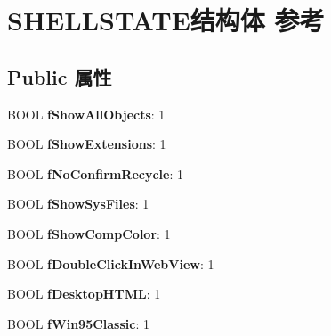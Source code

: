 \hypertarget{struct_s_h_e_l_l_s_t_a_t_e}{}\section{S\+H\+E\+L\+L\+S\+T\+A\+T\+E结构体 参考}
\label{struct_s_h_e_l_l_s_t_a_t_e}
\subsection*{Public 属性}
\begin{DoxyCompactItemize}
\item 
\mbox{\label{struct_s_h_e_l_l_s_t_a_t_e_accc3ecbc80362e9bc1f5f5df528abcb3}} 
B\+O\+OL {\bfseries f\+Show\+All\+Objects}\+: 1
\item 
\mbox{\label{struct_s_h_e_l_l_s_t_a_t_e_a5a3a2411b2d48b57b29e4e26ad141991}} 
B\+O\+OL {\bfseries f\+Show\+Extensions}\+: 1
\item 
\mbox{\label{struct_s_h_e_l_l_s_t_a_t_e_a8328988495d10b0d3ead153fb75b43a7}} 
B\+O\+OL {\bfseries f\+No\+Confirm\+Recycle}\+: 1
\item 
\mbox{\label{struct_s_h_e_l_l_s_t_a_t_e_a1c8f8d07d21fa1a967b86da0a3b813d3}} 
B\+O\+OL {\bfseries f\+Show\+Sys\+Files}\+: 1
\item 
\mbox{\label{struct_s_h_e_l_l_s_t_a_t_e_a83c1da235d4b0bbc65cd29846c71ef05}} 
B\+O\+OL {\bfseries f\+Show\+Comp\+Color}\+: 1
\item 
\mbox{\label{struct_s_h_e_l_l_s_t_a_t_e_adc552e60d28bda2d2e14230593b844fd}} 
B\+O\+OL {\bfseries f\+Double\+Click\+In\+Web\+View}\+: 1
\item 
\mbox{\label{struct_s_h_e_l_l_s_t_a_t_e_a397d22bbc8770ddb776711e22f0a433c}} 
B\+O\+OL {\bfseries f\+Desktop\+H\+T\+ML}\+: 1
\item 
\mbox{\label{struct_s_h_e_l_l_s_t_a_t_e_a288f52668249e85b709443b799ef891f}} 
B\+O\+OL {\bfseries f\+Win95\+Classic}\+: 1
\item 

\end{DoxyCompactItemize}
